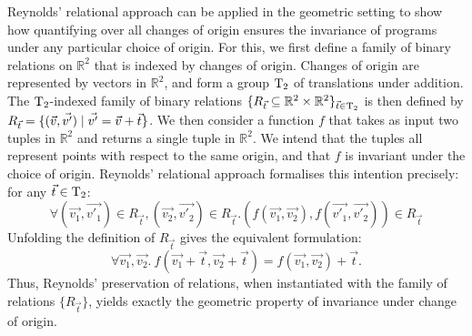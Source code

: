 Reynolds' relational approach can be applied in the geometric setting
to show how quantifying over all changes of origin ensures the
invariance of programs under any particular choice of origin. For
this, we first define a family of binary relations on $\mathbb{R}^2$
that is indexed by changes of origin. Changes of origin are
represented by vectors in $\mathbb{R}^2$, and form a group
$\mathrm{T}_2$ of translations under addition. The $\mathrm{T}_2$-indexed
family of binary relations $\{ R_{\vec{t}} \subseteq \mathbb{R}^2
\times \mathbb{R}^2 \}_{\vec{t} \in \mathrm{T}_2}$ is then defined by
$R_{\vec{t}} = \{ (\vec{v}, \vec{v'}) \mathrel| \vec{v'} = \vec{v} + \vec{t} \}$.
We then consider a function $f$ that takes as input two tuples in
$\mathbb{R}^2$ and returns a single tuple in $\mathbb{R}^2$. We intend
that the tuples all represent points with respect to the same origin,
and that $f$ is invariant under the choice of origin.  Reynolds'
relational approach formalises this intention precisely: for any
$\vec{t} \in \mathrm{T}_2$: %
\begin{equation}\label{eq:f-preserve-rel-frame}
  \forall (\vec{v_1},\vec{v'_1}) \in R_{\vec{t}},
  (\vec{v_2},\vec{v'_2}) \in R_{\vec{t}}. (f(\vec{v_1}, \vec{v_2}),
  f(\vec{v'_1}, \vec{v'_2})) \in R_{\vec{t}}
\end{equation}
Unfolding the definition of $R_{\vec{t}}$ gives the equivalent formulation:
\begin{equation}\label{eq:f-invariant-frame}
  \forall \vec{v_1}, \vec{v_2}.\ f(\vec{v_1} + \vec{t},\vec{v_2} +
  \vec{t}) = f(\vec{v_1},\vec{v_2}) + \vec{t}.
\end{equation}
Thus, Reynolds' preservation of relations, when instantiated with the
family of relations $\{R_{\vec{t}}\}$, yields exactly the geometric
property of invariance under change of origin.

